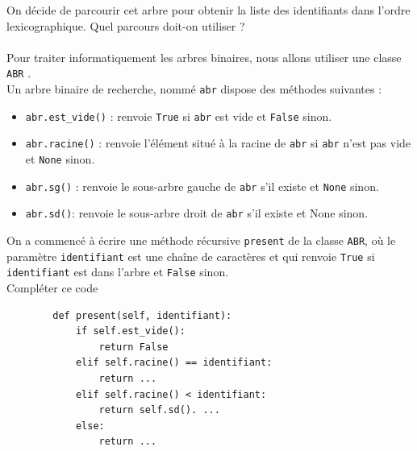 \documentclass[a4paper,12pt,article,firamath]{nsi}
\begin{document}

\question On décide de parcourir cet arbre pour obtenir la liste des identifiants dans l'ordre
lexicographique. Quel parcours doit-on utiliser ?\\

\\

Pour traiter informatiquement les arbres binaires, nous allons utiliser une classe
\texttt{ABR} .\\
Un arbre binaire de recherche, nommé \texttt{abr}  dispose des méthodes suivantes :
\begin{itemize}
    \item \texttt{abr.est_vide()} : renvoie \texttt{True}  si \texttt{abr} est vide et \texttt{False} sinon.
    \item \texttt{abr.racine()} : renvoie l'élément situé à la racine de \texttt{abr}  si \texttt{abr} n'est pas vide et \texttt{None} sinon.
    \item \texttt{abr.sg()} : renvoie le sous-arbre gauche de \texttt{abr}  s'il existe et \texttt{None} sinon.
    \item \texttt{abr.sd()}: renvoie le sous-arbre droit de \texttt{abr} s'il existe et None sinon.
\end{itemize}

On a commencé à écrire une méthode récursive \texttt{present}  de la classe \texttt{ABR}, où le paramètre \texttt{identifiant}  est une chaîne de caractères et qui renvoie \texttt{True}  si \texttt{identifiant} est dans l'arbre et \texttt{False} sinon.\\

\question Compléter ce code
\begin{pyc}
    \begin{verbatim}
        def present(self, identifiant):
            if self.est_vide():
                return False
            elif self.racine() == identifiant:
                return ...
            elif self.racine() < identifiant:
                return self.sd(). ...
            else:
                return ...
    \end{verbatim}
\end{pyc}
\end{document}
